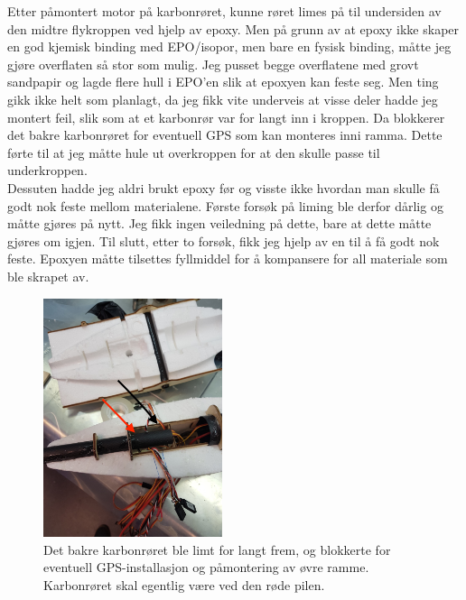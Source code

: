 \documentclass[12pt, a4paper]{article}
\begin{document}
\newpage
Etter påmontert motor på karbonrøret, kunne røret limes på til undersiden av den midtre flykroppen ved hjelp av epoxy. Men på grunn av at epoxy ikke skaper en god kjemisk binding med EPO/isopor, men bare en fysisk binding, måtte jeg gjøre overflaten så stor som mulig. Jeg pusset begge overflatene med grovt sandpapir og lagde flere hull i EPO'en slik at epoxyen kan feste seg. 
Men ting gikk ikke helt som planlagt, da jeg fikk vite underveis at visse deler hadde jeg montert feil, slik som at et karbonrør var for langt inn i kroppen. Da blokkerer det bakre karbonrøret for eventuell GPS som kan monteres inni ramma. Dette førte til at jeg måtte hule ut overkroppen for at den skulle passe til underkroppen. \\
Dessuten hadde jeg aldri brukt epoxy før og visste ikke hvordan man skulle få godt nok feste mellom materialene. Første forsøk på liming ble derfor dårlig og måtte gjøres på nytt. Jeg fikk ingen veiledning på dette, bare at dette måtte gjøres om igjen. Til slutt, etter to forsøk, fikk jeg hjelp av en til å få godt nok feste. Epoxyen måtte tilsettes fyllmiddel for å kompansere for all materiale som ble skrapet av. \\


\begin{figure}[ht]
	\centering
	\includegraphics[height = 7cm, width = .6\textwidth]{bilder/feilmontering_av_karbon_red.jpg}
	\caption[Feilliming]{Det bakre karbonrøret ble limt for langt frem, og blokkerte for eventuell GPS-installasjon og påmontering av øvre ramme. Karbonrøret skal egentlig være ved den røde pilen.}
\end{figure}
\end{document}
